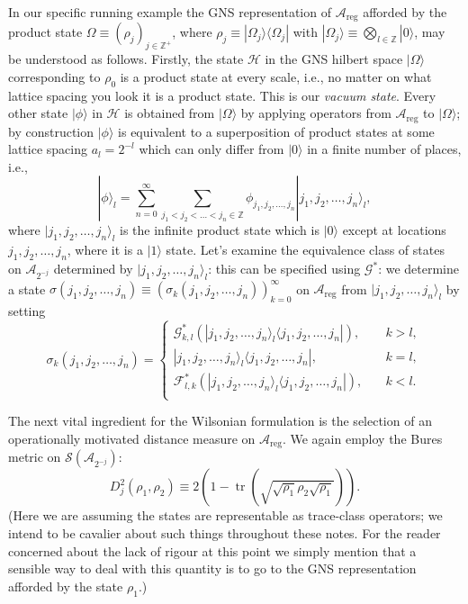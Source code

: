\documentclass[11pt]{amsart}
\DeclareMathOperator{\tr}{tr}
\theoremstyle{plain}%
\theoremstyle{definition}
\theoremstyle{remark}
\begin{document}
In our specific running example the GNS representation of $\mathcal{A}_{\text{reg}}$ afforded by the product state  $\Omega \equiv (\rho_j)_{j\in \mathbb{Z}^+}$, where $\rho_j \equiv |\Omega_j\rangle\langle \Omega_j|$ with $|\Omega_j\rangle \equiv \bigotimes_{l\in \mathbb{Z}} |0\rangle$, may be understood as follows. Firstly, the state $\mathcal{H}$ in the GNS hilbert space  $|\Omega\rangle$ corresponding to $\rho_0$ is a product state at every scale, i.e., no matter on what lattice spacing you look it is a product state. This is our \emph{vacuum state}. Every other state $|\phi\rangle$ in $\mathcal{H}$ is obtained from $|\Omega\rangle$ by applying operators from $\mathcal{A}_{\text{reg}}$ to $|\Omega\rangle$; by construction $|\phi\rangle$ is equivalent to a superposition of product states at some lattice spacing $a_l = 2^{-l}$ which can only differ from $|0\rangle$ in a finite number of places, i.e.,  
\begin{equation}
	|\phi\rangle_l = \sum_{n=0}^\infty\sum_{j_1 < j_2 < \ldots< j_n \in \mathbb{Z}} \phi_{j_1,j_2, \ldots, j_n}|j_1,j_2, \ldots, j_n\rangle_l,
\end{equation} 
where $|j_1,j_2, \ldots, j_n\rangle_l$ is the infinite product state which is $|0\rangle$ except at locations $j_1, j_2, \ldots, j_n$, where it is a $|1\rangle$ state. Let's examine the equivalence class of states on $\mathcal{A}_{2^{-j}}$ determined by $|j_1,j_2, \ldots, j_n\rangle_l$: this can be specified using $\mathcal{G}^{*}$: we determine a state $\sigma(j_1,j_2, \ldots, j_n) \equiv (\sigma_k(j_1,j_2, \ldots, j_n))_{k=0}^\infty$ on $\mathcal{A}_{\text{reg}}$ from $|j_1,j_2, \ldots, j_n\rangle_l$ by setting 
\begin{equation}
	 \sigma_k(j_1,j_2, \ldots, j_n) = \begin{cases}
	 	\mathcal{G}^{*}_{k,l}(|j_1,j_2, \ldots, j_n\rangle_l\langle j_1,j_2, \ldots, j_n|), &\quad k>l, \\
	 	|j_1,j_2, \ldots, j_n\rangle_l\langle j_1,j_2, \ldots, j_n|, &\quad k = l, \\
	 	\mathcal{F}^{*}_{l,k}(|j_1,j_2, \ldots, j_n\rangle_l\langle j_1,j_2, \ldots, j_n|), &\quad k<l. \\
	 \end{cases}
\end{equation} 


The next vital ingredient for the Wilsonian formulation is the selection of an operationally motivated distance measure on $\mathcal{A}_{\text{reg}}$. We again employ the Bures metric on $\mathcal{S}(\mathcal{A}_{2^{-j}})$:
\begin{equation}
	D^2_j(\rho_1,\rho_2) \equiv 2\left(1-\tr\left(\sqrt{\sqrt{\rho_1}\rho_2\sqrt{\rho_1}}\right)\right).
\end{equation}
(Here we are assuming the states are representable as trace-class operators; we intend to be cavalier about such things throughout these notes. For the reader concerned about the lack of rigour at this point we simply mention that a sensible way to deal with this quantity is to go to the GNS representation afforded by the state $\rho_1$.)
\end{document}
